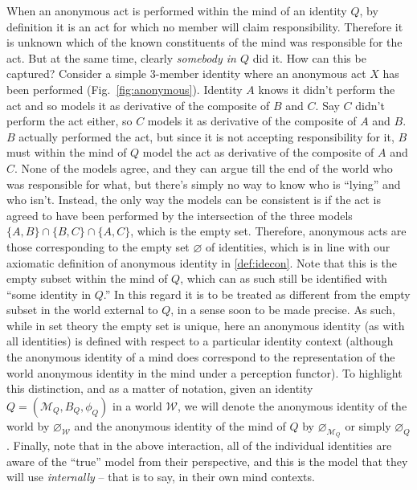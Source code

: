 \documentclass[pra,twocolumn,groupedaddress,10pt]{revtex4}
\theoremstyle{definition}
\begin{document}
When an anonymous act is performed within the mind of an identity $Q$, by definition it is an act for which no member will claim responsibility. Therefore it is unknown which of the known constituents of the mind was responsible for the act. But at the same time, clearly \textit{somebody in $Q$} did it. How can this be captured? Consider a simple $3$-member identity where an anonymous act $X$ has been performed (Fig.~\ref{fig:anonymous}). Identity $A$ knows it didn't perform the act and so models it as derivative of the composite of $B$ and $C$. Say $C$ didn't perform the act either, so $C$ models it as derivative of the composite of $A$ and $B$. $B$ actually performed the act, but since it is not accepting responsibility for it, $B$ must within the mind of $Q$ model the act as derivative of the composite of $A$ and $C$. None of the models agree, and they can argue till the end of the world who was responsible for what, but there's simply no way to know who is ``lying'' and who isn't. Instead, the only way the models can be consistent is if the act is agreed to have been performed by the intersection of the three models $\{A, B\} \cap \{B, C\} \cap \{A, C\}$, which is the empty set. Therefore, anonymous acts are those corresponding to the empty set $\varnothing$ of identities, which is in line with our axiomatic definition of anonymous identity in \autoref{def:idecon}. Note that this is the empty subset within the mind of $Q$, which can as such still be identified with ``some identity in $Q$.'' In this regard it is to be treated as different from the empty subset in the world external to $Q$, in a sense soon to be made precise. As such, while in set theory the empty set is unique, here an anonymous identity (as with all identities) is defined with respect to a particular identity context (although the anonymous identity of a mind does correspond to the representation of the world anonymous identity in the mind under a perception functor). To highlight this distinction, and as a matter of notation, given an identity $Q = (\mathcal{M}_Q, B_Q, \phi_Q)$ in a world $\mathcal{W}$, we will denote the anonymous identity of the world by $\varnothing_\mathcal{W}$ and the anonymous identity of the mind of $Q$ by $\varnothing_{\mathcal{M}_Q}$ or simply $\varnothing_Q$. Finally, note that in the above interaction, all of the individual identities are aware of the ``true'' model from their perspective, and this is the model that they will use \textit{internally} -- that is to say, in their own mind contexts.
\end{document}

